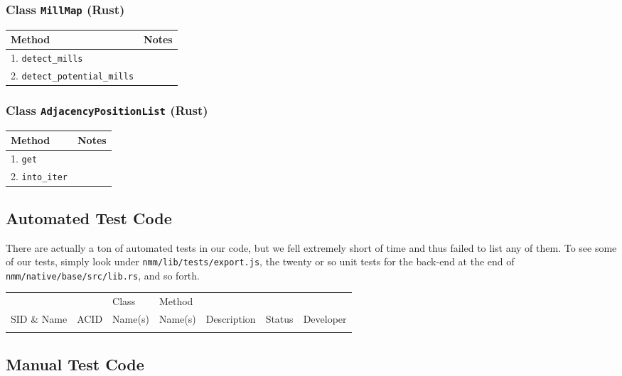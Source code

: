 \documentclass[11pt]{article}
\begin{document}
\subsubsection{Class \texttt{MillMap} (Rust)}
\label{sec:orge9727c3}
\begin{center}
\begin{tabular}{|l|l|}
Method & Notes\\
\hline
1. \texttt{detect\_mills} & \\
2. \texttt{detect\_potential\_mills} & \\
\end{tabular}
\end{center}

\subsubsection{Class \texttt{AdjacencyPositionList} (Rust)}
\label{sec:org800520f}
\begin{center}
\begin{tabular}{|l|l|}
Method & Notes\\
\hline
1. \texttt{get} & \\
2. \texttt{into\_iter} & \\
\end{tabular}
\end{center}

\subsection{Automated Test Code}
\label{sec:org30742ad}

There are actually a ton of automated tests in our code, but we fell extremely short of time and
thus failed to list any of them. To see some of our tests, simply look under
\texttt{nmm/lib/tests/export.js}, the twenty or so unit tests for the back-end at the end of
\texttt{nmm/native/base/src/lib.rs}, and so forth.

\begin{center}
\begin{tabular}{|l|l|p{2.5cm}|p{2.5cm}|p{2.5cm}|l|l|}
 &  & Class & Method &  &  & \\
SID \& Name & ACID & Name(s) & Name(s) & Description & Status & Developer\\
\hline
 &  &  &  &  &  & \\
\end{tabular}
\end{center}
\subsection{Manual Test Code}
\label{sec:org75fabb4}
\end{document}
